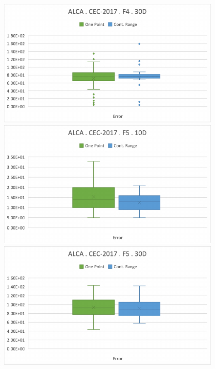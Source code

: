 \documentclass[graybox]{svmult}
\begin{document}
\begin{figure}[!ht]
\begin{minipage}[h]{0.49\linewidth}
        \end{minipage}
        \hfill
        \begin{minipage}[h]{0.49\linewidth}
            \includegraphics[width=1\linewidth]{img/fig_experiment_F4x30D.pdf} 
        \end{minipage}
        \vfill
        \vspace{0.05 cm}
        \begin{minipage}[h]{0.49\linewidth}
            \includegraphics[width=1\linewidth]{img/fig_experiment_F5x10D.pdf} 
        \end{minipage}
        \hfill
        \begin{minipage}[h]{0.49\linewidth}
            \includegraphics[width=1\linewidth]{img/fig_experiment_F5x30D.pdf} 

\end{minipage}
\end{figure}
\end{document}

